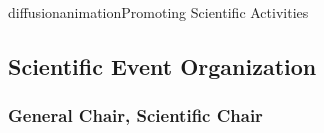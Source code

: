 \documentclass{ra2016}
\begin{document}


\begin{module}{diffusion}{animation}{Promoting Scientific Activities}



\subsection{Scientific Event Organization}

\subsubsection{General Chair, Scientific Chair}


\end{module}
\end{document}
